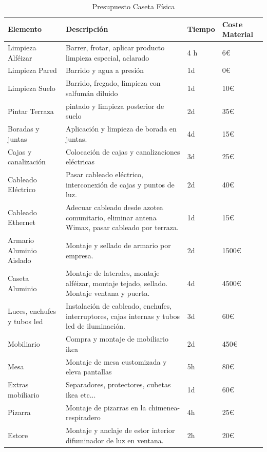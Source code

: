 \begin{center}
\label{T:presupuesto}
\begin{longtable}[ht]{|p{3cm}|p{8cm}|p{1.5cm}|p{1.5cm}|}
\caption{Presupuesto Caseta Física}
    \\ \hline
    \textbf{Elemento} & \textbf{Descripción} & \textbf{Tiempo} & \textbf{Coste Material} \\ \hline
    Limpieza Alféizar & Barrer, frotar, aplicar producto limpieza especial, aclarado & 4 h & 6€ \\ \hline
    Limpieza Pared & Barrido y agua a presión & 1d & 0€ \\ \hline
    Limpieza Suelo & Barrido, fregado, limpieza con salfumán diluido & 1d & 10€ \\ \hline
    Pintar Terraza & pintado y limpieza posterior de suelo & 2d & 35€ \\ \hline
    Boradas y juntas & Aplicación y limpieza de borada en juntas. & 4d & 15€ \\ \hline
    Cajas y canalización & Colocación de cajas y canalizaciones eléctricas & 3d & 25€ \\ \hline
    Cableado Eléctrico & Pasar cableado eléctrico, interconexión de cajas y puntos de luz. & 2d & 40€ \\ \hline
    Cableado Ethernet & Adecuar cableado desde azotea comunitario, eliminar antena Wimax, pasar cableado por terraza. & 1d & 15€ \\ \hline
    Armario Aluminio Aislado & Montaje y sellado de armario por empresa. & 2d & 1500€ \\ \hline
    Caseta Aluminio & Montaje de laterales, montaje alféizar, montaje tejado, sellado. Montaje ventana y puerta. & 4d & 4500€ \\ \hline
    Luces, enchufes y tubos led & Instalación de cableado, enchufes, interruptores, cajas internas y tubos led de iluminación. & 3d & 60€ \\ \hline
    Mobiliario & Compra y montaje de mobiliario ikea & 2d & 450€ \\ \hline
    Mesa & Montaje de mesa customizada y eleva pantallas & 5h & 80€ \\ \hline
    Extras mobiliario & Separadores, protectores, cubetas ikea etc... & 1d & 60€ \\ \hline
    Pizarra & Montaje de pizarras en la chimenea-respiradero & 4h & 25€ \\ \hline
    Estore & Montaje y anclaje de estor interior difuminador de luz en ventana. & 2h & 20€ \\ \hline

\end{longtable}
\end{center}
